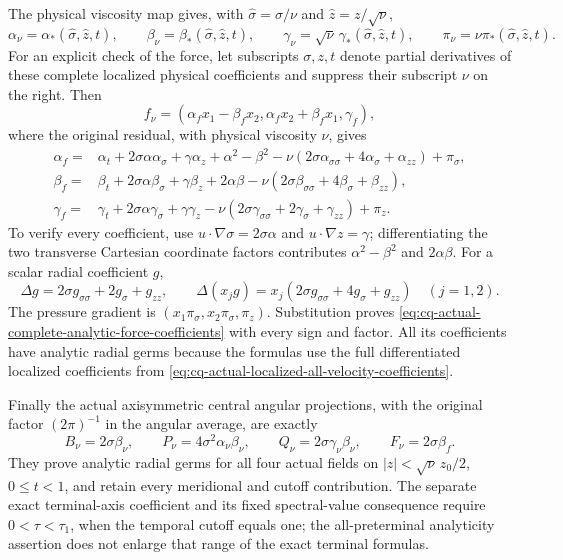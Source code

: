 The physical viscosity map gives, with
$\widehat\sigma=\sigma/\nu$ and
$\widehat z=z/\sqrt\nu$,
\[
 \alpha_\nu=\alpha_*(\widehat\sigma,\widehat z,t),\qquad
 \beta_\nu=\beta_*(\widehat\sigma,\widehat z,t),\qquad
 \gamma_\nu=\sqrt\nu\,
                  \gamma_*(\widehat\sigma,\widehat z,t),\qquad
 \pi_\nu=\nu\pi_*(\widehat\sigma,\widehat z,t).
\]
For an explicit check of the force, let subscripts $\sigma,z,t$
denote partial derivatives of these complete localized physical
coefficients and suppress their subscript $\nu$ on the right.
Then
\[
 f_\nu=(\alpha_f x_1-\beta_f x_2,
        \alpha_f x_2+\beta_f x_1,\gamma_f),
\]
where the original residual, with physical viscosity $\nu$, gives
\begin{equation}
\begin{aligned}
 \alpha_f={}&\alpha_t+2\sigma\alpha\alpha_\sigma
       +\gamma\alpha_z+\alpha^2-\beta^2
       -\nu(2\sigma\alpha_{\sigma\sigma}
                    +4\alpha_\sigma+\alpha_{zz})+\pi_\sigma,\\
 \beta_f={}&\beta_t+2\sigma\alpha\beta_\sigma
       +\gamma\beta_z+2\alpha\beta
       -\nu(2\sigma\beta_{\sigma\sigma}
                    +4\beta_\sigma+\beta_{zz}),\\
 \gamma_f={}&\gamma_t+2\sigma\alpha\gamma_\sigma
       +\gamma\gamma_z
       -\nu(2\sigma\gamma_{\sigma\sigma}
                    +2\gamma_\sigma+\gamma_{zz})+\pi_z.
\end{aligned}
 \label{eq:cq-actual-complete-analytic-force-coefficients}
\end{equation}
To verify every coefficient, use
$u\cdot\nabla\sigma=2\sigma\alpha$ and
$u\cdot\nabla z=\gamma$; differentiating the two transverse
Cartesian coordinate factors contributes $\alpha^2-\beta^2$
and $2\alpha\beta$. For a scalar radial coefficient $g$,
\[
 \Delta g=2\sigma g_{\sigma\sigma}+2g_\sigma+g_{zz},
 \qquad
 \Delta(x_jg)=x_j(2\sigma g_{\sigma\sigma}
                                  +4g_\sigma+g_{zz})
       \quad(j=1,2).
\]
The pressure gradient is
$(x_1\pi_\sigma,x_2\pi_\sigma,\pi_z)$.
Substitution proves
\eqref{eq:cq-actual-complete-analytic-force-coefficients}
with every sign and factor. All its coefficients have analytic
radial germs because the formulas use the full differentiated
localized coefficients from
\eqref{eq:cq-actual-localized-all-velocity-coefficients}.

Finally the actual axisymmetric central angular projections,
with the original factor $(2\pi)^{-1}$ in the angular average,
are exactly
\[
 B_\nu=2\sigma\beta_\nu,\qquad
 P_\nu=4\sigma^2\alpha_\nu\beta_\nu,\qquad
 Q_\nu=2\sigma\gamma_\nu\beta_\nu,\qquad
 F_\nu=2\sigma\beta_f .
\]
They prove analytic radial germs for all four actual fields on
$|z|<\sqrt\nu\,z_0/2$, $0\leq t<1$, and retain every
meridional and cutoff contribution. The separate exact
terminal-axis coefficient and its fixed spectral-value consequence
require $0<\tau<\tau_1$, when the temporal cutoff equals one;
the all-preterminal analyticity assertion does not enlarge that
range of the exact terminal formulas.



